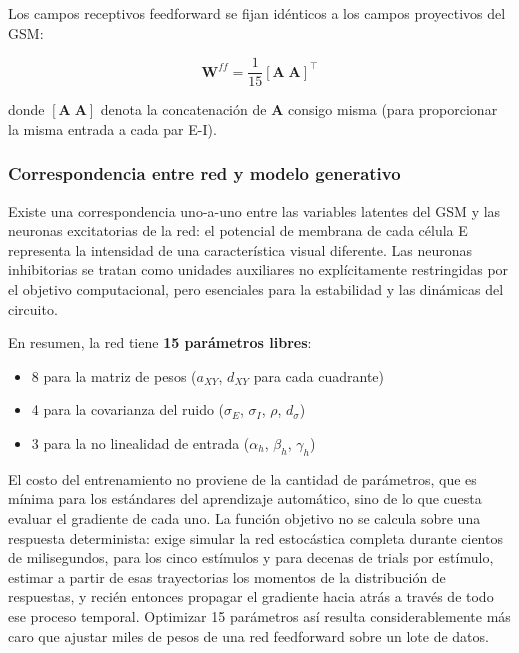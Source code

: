 Los campos receptivos feedforward se fijan idénticos a los campos proyectivos del \acrshort{GSM}:

\begin{equation}
\mathbf{W}^{ff} = \frac{1}{15} [\mathbf{A} \; \mathbf{A}]^\top
\label{eq:feedforward_weights}
\end{equation}

donde $[\mathbf{A} \; \mathbf{A}]$ denota la concatenación de $\mathbf{A}$ consigo misma (para proporcionar la misma entrada a cada par E-I).

\subsubsection{Correspondencia entre red y modelo generativo}

Existe una correspondencia uno-a-uno entre las variables latentes del \acrshort{GSM} y las neuronas excitatorias de la red: el potencial de membrana de cada célula E representa la intensidad de una característica visual diferente. Las neuronas inhibitorias se tratan como unidades auxiliares no explícitamente restringidas por el objetivo computacional, pero esenciales para la estabilidad y las dinámicas del circuito.

En resumen, la red tiene \textbf{15 parámetros libres}:
\begin{itemize}
    \item 8 para la matriz de pesos ($a_{XY}$, $d_{XY}$ para cada cuadrante)
    \item 4 para la covarianza del ruido ($\sigma_E$, $\sigma_I$, $\rho$, $d_\sigma$)
    \item 3 para la no linealidad de entrada ($\alpha_h$, $\beta_h$, $\gamma_h$)
\end{itemize}

El costo del entrenamiento no proviene de la cantidad de parámetros, que es mínima para los estándares del aprendizaje automático, sino de lo que cuesta evaluar el gradiente de cada uno. La función objetivo no se calcula sobre una respuesta determinista: exige simular la red estocástica completa durante cientos de milisegundos, para los cinco estímulos y para decenas de trials por estímulo, estimar a partir de esas trayectorias los momentos de la distribución de respuestas, y recién entonces propagar el gradiente hacia atrás a través de todo ese proceso temporal. Optimizar 15 parámetros así resulta considerablemente más caro que ajustar miles de pesos de una red feedforward sobre un lote de datos.

